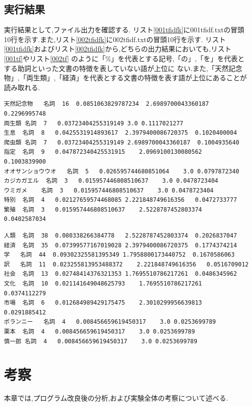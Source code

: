 \documentclass[a4j]{jarticle}
\begin{document}
\subsection{実行結果}
実行結果として,ファイル出力を確認する.
リスト\ref{001tfidfk}に001tfidf.txtの冒頭10行を示す.また,リスト\ref{002tfidfk}に002tfidf.txtの冒頭10行を示す.
リスト\ref{001tfidfk}およびリスト\ref{002tfidfk}から,どちらの出力結果においても,リスト\ref{001tf}やリスト\ref{002tf}
のように「\%」を代表とする記号,「の」,「を」を代表とする助詞といった文書の特徴を表していない語が上位に
ない.また,「天然記念物」,「両生類」,「経済」を代表とする文書の特徴を表す語が上位にあることが読み取れる.
\begin{lstlisting}[basicstyle=\ttfamily\footnotesize, frame=single,label=001tfidfk,caption=001tfidf.txtの出力内容(改良後)]
天然記念物	名詞	16	0.0851063829787234	2.6989700043360187	0.2296995748
両生類	名詞	7	0.03723404255319149	3.0	0.1117021277
生息	名詞	8	0.0425531914893617	2.3979400086720375	0.1020400004
爬虫類	名詞	7	0.03723404255319149	2.6989700043360187	0.1004935640
指定	名詞	9	0.047872340425531915	2.0969100130080562	0.1003839900
オオサンショウウオ	名詞	5	0.026595744680851064	3.0	0.0797872340
カジカガエル	名詞	3	0.015957446808510637	3.0	0.0478723404
ウミガメ	名詞	3	0.015957446808510637	3.0	0.0478723404
特別	名詞	4	0.02127659574468085	2.221848749616356	0.0472733777
繁殖	名詞	3	0.015957446808510637	2.5228787452803374	0.0402587034
	\end{lstlisting}

\begin{lstlisting}[basicstyle=\ttfamily\footnotesize, frame=single,label=002tfidfk,caption=002tfidf.txtの出力内容(改良後)]
人類	名詞	38	0.080338266384778	2.5228787452803374	0.2026837047
経済	名詞	35	0.07399577167019028	2.3979400086720375	0.1774374214
学	名詞	44	0.09302325581395349	1.7958800173440752	0.1670586063
訳	名詞	11	0.023255813953488372	2.221848749616356	0.0516709012
社会	名詞	13	0.02748414376321353	1.7695510786217261	0.0486345962
文化	名詞	10	0.021141649048625793	1.7695510786217261	0.0374112279
市場	名詞	6	0.012684989429175475	2.3010299956639813	0.0291885412
ポランニー	名詞	4	0.008456659619450317	3.0	0.0253699789
栗本	名詞	4	0.008456659619450317	3.0	0.0253699789
慎一郎	名詞	4	0.008456659619450317	3.0	0.0253699789
			\end{lstlisting}

\section{考察}
本章では,プログラム改良後の分析,および実験全体の考察について述べる.
\end{document}
